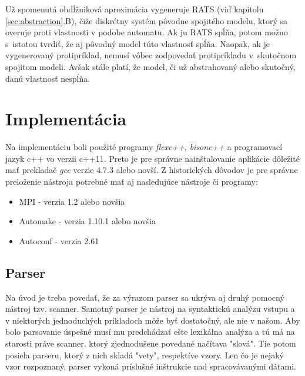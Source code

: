 \documentclass[11pt,final,oneside]{fithesis}
\begin{document}
U\v z spomenut\'a obd\'l\v znikov\'a aproxim\'acia vygeneruje RATS (vi\v d kapitolu \ref{sec:abstraction}.B), \v ci\v ze diskr\'etny syst\'em p\^ ovodne spojit\'eho 
modelu, ktor\'y sa overuje proti vlastnosti v podobe automatu. Ak ju RATS sp\'l\v na, potom mo\v zno s~istotou tvrdi\v t, \v ze aj p\^ ovodn\'y model t\'uto
vlastnos\v t sp\'l\v na. Naopak, ak je vygenerovan\'y protipr\'iklad, nemus\'i v\^ obec zodpoveda\v t protipr\'ikladu v~skuto\v cnom spojitom modeli.
Av\v sak st\'ale plat\'i, \v ze model, \v ci u\v z abstrahovan\'y alebo skuto\v cn\'y, dan\'u vlastnos\v t nesp\'l\v na. \cite{BIODIVINE}

\chapter{Implement\' acia}
Na implement\'aciu boli pou\v zit\'e programy {\it flexc++}, {\it bisonc++} a programovac\'i jazyk c++ vo verzii c++11. Preto je pre spr\'avne 
nain\v stalovanie aplik\'acie d\^ ole\v zit\'e ma\v t preklada\v c {\it gcc} verzie 4.7.3 alebo nov\v s\'i. Z historick\'ych d\^ ovodov je pre spr\'avne 
prelo\v zenie n\'astroja potrebn\'e ma\v t aj nasleduj\'uce n\'astroje \v ci programy:
\begin{itemize}
\item MPI - verzia 1.2 alebo nov\v sia
\item Automake - verzia 1.10.1 alebo nov\v sia
\item Autoconf - verzia 2.61
\end{itemize}
\cite{sybila-biodivine}

\section{Parser}
\label{sec:implParser}
Na \'uvod je treba poveda\v t, \v ze za v\'yrazom parser sa ukr\'yva aj druh\'y pomocn\'y n\'astroj tzv. scanner. Samotn\'y parser je n\'astroj na syntaktick\'u 
anal\'yzu vstupu a v niektor\'ych jednoduch\'ych pr\'ikladoch m\^ o\v ze by\v t dostato\v cn\'y, ale nie v na\v som. Aby bolo parsovanie \'uspe\v sn\'e mus\'i
mu predch\'adza\v t e\v ste lexik\'alna anal\'yza a t\'u m\'a na starosti pr\'ave scanner, ktor\'y zjednodu\v sene povedan\'e na\v c\'itava "slov\'a". Tie potom
posiela parseru, ktor\'y z nich sklad\'a "vety", respekt\'ive vzory. Len \v co je nejak\'y vzor rozpoznan\'y, parser vykon\'a pr\'islu\v sn\'e in\v strukcie 
nad spracov\'avan\'ymi d\'atami.
\end{document}
